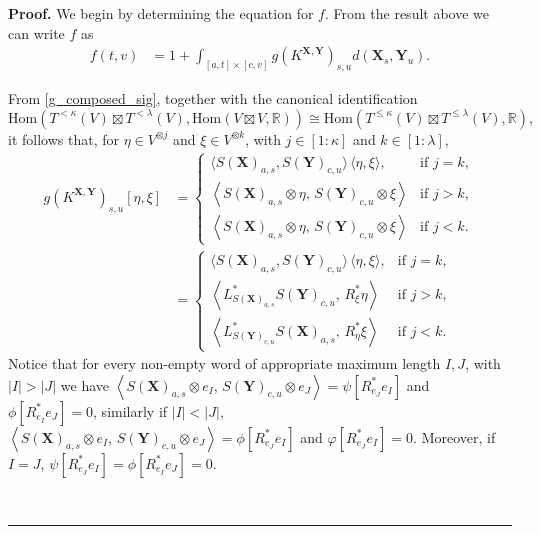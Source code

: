 \documentclass{article}%
\newenvironment{proof}[1][Proof]{\noindent\textbf{#1.} }{\ \rule{0.5em}{0.5em}}
\begin{document}
\begin{proof}
    We begin by determining the equation for $f$. From the result above we can write $f$ as 
    \begin{align*}
    f(t,v) &= 1 + \int_{[a,t] \times [c,v]} g(K^{\mathbf{X}, \mathbf{Y}})_{s,u} d(\mathbf{X}_s, \mathbf{Y}_u).
    \end{align*}

    From \eqref{g_composed_sig}, together with the canonical identification
\[
\mathrm{Hom}\!\left(T^{< \kappa}(V)\boxtimes T^{< \lambda}(V),\mathrm{Hom}\!\left(V\boxtimes V,\mathbb{R}\right)\right)
\cong
\mathrm{Hom}\!\left(T^{\le \kappa}(V)\boxtimes T^{\le \lambda}(V),\mathbb{R}\right),
\]
it follows that, for \(\eta \in V^{\otimes j}\) and \(\xi \in V^{\otimes k}\), with
\(j \in [1:\kappa]\) and \(k \in [1:\lambda]\),
\begin{align*}
g\!\left(K^{\mathbf X,\mathbf Y}\right)_{s,u}[\eta,\xi]
&=
\begin{cases}
\langle S(\mathbf X)_{a,s}, S(\mathbf Y)_{c,u}\rangle \, \langle \eta,\xi\rangle,
& \text{if } j=k, \\[0.5em]
\displaystyle
\left\langle S(\mathbf X)_{a,s}\otimes \eta,\, S(\mathbf Y)_{c,u} \otimes \xi \right\rangle
& \text{if } j>k, \\[0.8em]
\displaystyle
\left\langle S(\mathbf X)_{a,s}\otimes \eta,\, S(\mathbf Y)_{c,u} \otimes \xi \right\rangle
& \text{if } j<k.
\end{cases}\\
&= \begin{cases}
\langle S(\mathbf X)_{a,s}, S(\mathbf Y)_{c,u}\rangle \, \langle \eta,\xi\rangle,
& \text{if } j=k, \\[0.5em]
\displaystyle
\left\langle L^*_{S(\mathbf X)_{a,s}} S(\mathbf Y)_{c,u},\,  R^*_\xi \eta \right\rangle
& \text{if } j>k, \\[0.8em]
\displaystyle
\left\langle L^*_{S(\mathbf Y)_{c,u} } S(\mathbf X)_{a,s},\,   R^*_{\eta}\xi \right\rangle
& \text{if } j<k.
\end{cases}
\end{align*}
Notice that for every non-empty word of appropriate maximum length $I, J$, with $|I| > |J|$ we have $
\left\langle S(\mathbf X)_{a,s}\otimes e_I,\, S(\mathbf Y)_{c,u} \otimes e_J\right\rangle = \psi[R^*_{e_J} e_I]$   and $\phi[R^*_{e_I} e_J] = 0$, similarly if $|I| < |J|$, $
\left\langle S(\mathbf X)_{a,s} \otimes e_I,\, S(\mathbf Y)_{c,u} \otimes e_J\right\rangle = \phi[R^*_{e_J} e_I]$ and $\varphi[R^*_{e_J} e_I] = 0$. Moreover, if $I=J$, $\psi[R^*_{e_J} e_I] = \phi[R^*_{e_I} e_J] = 0$.\newline  

\end{proof}
\end{document}
